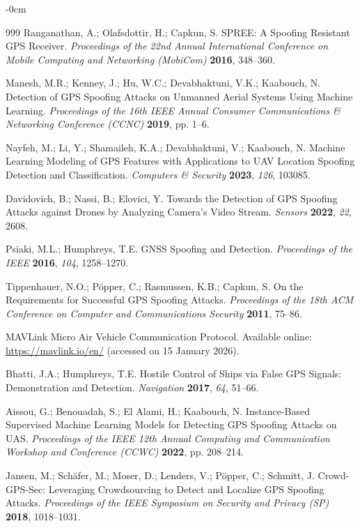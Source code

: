 \documentclass[electronics,article,accept,moreauthors]{Definitions/mdpi}
\begin{document}
\begin{adjustwidth}{-\extralength}{0cm}
\begin{thebibliography}{999}
Ranganathan, A.; Olafsdottir, H.; Capkun, S. SPREE: A Spoofing Resistant GPS Receiver. \textit{Proceedings of the 22nd Annual International Conference on Mobile Computing and Networking (MobiCom)} \textbf{2016}, 348--360.

Manesh, M.R.; Kenney, J.; Hu, W.C.; Devabhaktuni, V.K.; Kaabouch, N. Detection of GPS Spoofing Attacks on Unmanned Aerial Systems Using Machine Learning. \textit{Proceedings of the 16th IEEE Annual Consumer Communications \& Networking Conference (CCNC)} \textbf{2019}, pp. 1--6.

Nayfeh, M.; Li, Y.; Shamaileh, K.A.; Devabhaktuni, V.; Kaabouch, N. Machine Learning Modeling of GPS Features with Applications to UAV Location Spoofing Detection and Classification. \textit{Computers \& Security} \textbf{2023}, \textit{126}, 103085.

Davidovich, B.; Nassi, B.; Elovici, Y. Towards the Detection of GPS Spoofing Attacks against Drones by Analyzing Camera's Video Stream. \textit{Sensors} \textbf{2022}, \textit{22}, 2608.

Psiaki, M.L.; Humphreys, T.E. GNSS Spoofing and Detection. \textit{Proceedings of the IEEE} \textbf{2016}, \textit{104}, 1258--1270.

Tippenhauer, N.O.; Pöpper, C.; Rasmussen, K.B.; Capkun, S. On the Requirements for Successful GPS Spoofing Attacks. \textit{Proceedings of the 18th ACM Conference on Computer and Communications Security} \textbf{2011}, 75--86.

MAVLink Micro Air Vehicle Communication Protocol. Available online: \url{https://mavlink.io/en/} (accessed on 15 January 2026).

Bhatti, J.A.; Humphreys, T.E. Hostile Control of Ships via False GPS Signals: Demonstration and Detection. \textit{Navigation} \textbf{2017}, \textit{64}, 51--66.

Aissou, G.; Benouadah, S.; El Alami, H.; Kaabouch, N. Instance-Based Supervised Machine Learning Models for Detecting GPS Spoofing Attacks on UAS. \textit{Proceedings of the IEEE 12th Annual Computing and Communication Workshop and Conference (CCWC)} \textbf{2022}, pp. 208--214.

Jansen, M.; Schäfer, M.; Moser, D.; Lenders, V.; Pöpper, C.; Schmitt, J. Crowd-GPS-Sec: Leveraging Crowdsourcing to Detect and Localize GPS Spoofing Attacks. \textit{Proceedings of the IEEE Symposium on Security and Privacy (SP)} \textbf{2018}, 1018--1031.


\end{thebibliography}
\end{adjustwidth}
\end{document}
